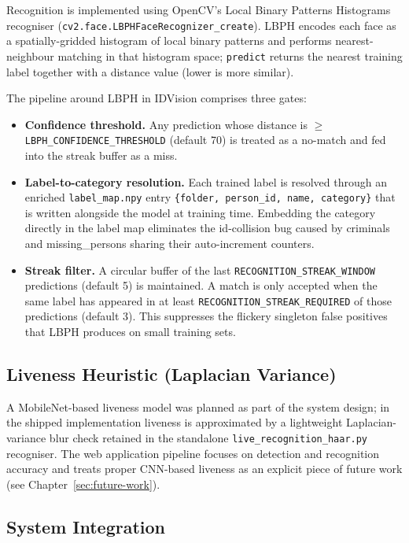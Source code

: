 \documentclass[11pt]{report}
\begin{document}
Recognition is implemented using OpenCV's Local Binary Patterns Histograms recogniser (\texttt{cv2.face.LBPHFaceRecognizer\_create}). LBPH encodes each face as a spatially-gridded histogram of local binary patterns and performs nearest-neighbour matching in that histogram space; \texttt{predict} returns the nearest training label together with a distance value (lower is more similar).

The pipeline around LBPH in IDVision comprises three gates:
\begin{itemize}
    \item \textbf{Confidence threshold.} Any prediction whose distance is $\geq$ \texttt{LBPH\_CONFIDENCE\_THRESHOLD} (default 70) is treated as a no-match and fed into the streak buffer as a miss.
    \item \textbf{Label-to-category resolution.} Each trained label is resolved through an enriched \texttt{label\_map.npy} entry \texttt{\{folder, person\_id, name, category\}} that is written alongside the model at training time. Embedding the category directly in the label map eliminates the id-collision bug caused by criminals and missing\_persons sharing their auto-increment counters.
    \item \textbf{Streak filter.} A circular buffer of the last \texttt{RECOGNITION\_STREAK\_WINDOW} predictions (default 5) is maintained. A match is only accepted when the same label has appeared in at least \texttt{RECOGNITION\_STREAK\_REQUIRED} of those predictions (default 3). This suppresses the flickery singleton false positives that LBPH produces on small training sets.
\end{itemize}

\subsection{Liveness Heuristic (Laplacian Variance)}

A MobileNet-based liveness model was planned as part of the system design; in the shipped implementation liveness is approximated by a lightweight Laplacian-variance blur check retained in the standalone \texttt{live\_recognition\_haar.py} recogniser. The web application pipeline focuses on detection and recognition accuracy and treats proper CNN-based liveness as an explicit piece of future work (see Chapter~\ref{sec:future-work}).

\subsection{System Integration}
\end{document}
